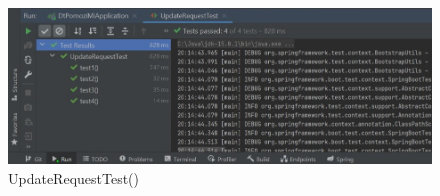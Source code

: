             \begin{figure}[H]
                 \includegraphics[width=\textwidth, height=\textheight, keepaspectratio]{slike/UpdateRequestTest.jpeg}
                \centering
                \caption{UpdateRequestTest()}
            \end{figure}
            
